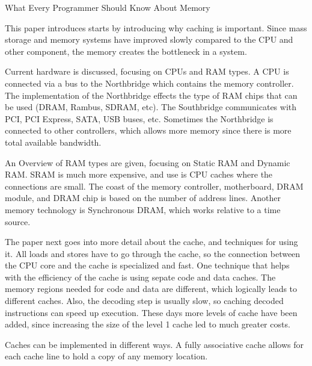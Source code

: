 \documentclass[letterpaper,12pt,titlepage]{article}
\begin{document}
\centerline{\large What Every Programmer Should Know About Memory}
This paper introduces starts by introducing why caching is important.  Since mass storage and memory systems have improved slowly compared
to the CPU and other component, the memory creates the bottleneck in a system.
\newline
\par
Current hardware is discussed, focusing on CPUs and RAM types.  A CPU is connected via a bus to the Northbridge which contains the memory controller.
The implementation of the Northbridge effects the type of RAM chips that can be used (DRAM, Rambus, SDRAM, etc).  The Southbridge communicates with
PCI, PCI Express, SATA, USB buses, etc.  Sometimes the Northbridge is connected to other controllers, which allows more memory since there is more
total available bandwidth.
\newline
\par
An Overview of RAM types are given, focusing on Static RAM and Dynamic RAM.  SRAM is much more expensive, and use is CPU caches where the connections
are small.  The coast of the memory controller, motherboard, DRAM module, and DRAM chip is based on the number of address lines.  Another memory technology
is Synchronous DRAM, which works relative to a time source.
\newline
\par
The paper next goes into more detail about the cache, and techniques for using it.  All loads and stores have to go through the cache, so the connection
between the CPU core and the cache is specialized and fast.  One technique that helps with the efficiency of the cache is using sepate code and data caches.
The memory regions needed for code and data are different, which logically leads to different caches.  Also, the decoding step is usually slow, so 
caching decoded instructions can speed up execution.  These days more levels of cache have been added, since increasing the size of the level 1 cache
led to much greater costs.
\newline
\par
Caches can be implemented in different ways.  A fully associative cache allows for each cache line to hold a copy of any memory location.
\end{document}
